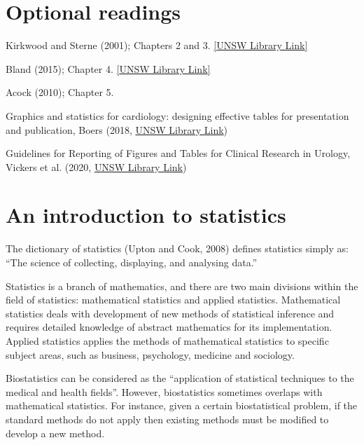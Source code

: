 \documentclass[
  a4paper,
]{memoir}
\begin{document}
\hypertarget{optional-readings}{%
\section*{Optional readings}\label{optional-readings}}


Kirkwood and Sterne (2001); Chapters 2 and 3.
\href{http://er1.library.unsw.edu.au/er/cgi-bin/eraccess.cgi?url=https://ebookcentral.proquest.com/lib/unsw/detail.action?docID=624728}{{[}UNSW
Library Link{]}}

Bland (2015); Chapter 4.
\href{http://er1.library.unsw.edu.au/er/cgi-bin/eraccess.cgi?url=https://ebookcentral.proquest.com/lib/unsw/detail.action?docID=5891730}{{[}UNSW
Library Link{]}}

Acock (2010); Chapter 5.

Graphics and statistics for cardiology: designing effective tables for
presentation and publication, Boers (2018,
\href{https://er1.library.unsw.edu.au/er/cgi-bin/eraccess.cgi?url=http://dx.doi.org/10.1136/heartjnl-2017-311581}{UNSW
Library Link})

Guidelines for Reporting of Figures and Tables for Clinical Research in
Urology, Vickers et al. (2020,
\href{https://er1.library.unsw.edu.au/er/cgi-bin/eraccess.cgi?url=http://dx.doi.org/10.1016/j.eururo.2020.04.048}{UNSW
Library Link})

\hypertarget{an-introduction-to-statistics}{%
\section{An introduction to
statistics}\label{an-introduction-to-statistics}}

The dictionary of statistics (Upton and Cook, 2008) defines statistics
simply as: ``The science of collecting, displaying, and analysing
data.''

Statistics is a branch of mathematics, and there are two main divisions
within the field of statistics: mathematical statistics and applied
statistics. Mathematical statistics deals with development of new
methods of statistical inference and requires detailed knowledge of
abstract mathematics for its implementation. Applied statistics applies
the methods of mathematical statistics to specific subject areas, such
as business, psychology, medicine and sociology.

Biostatistics can be considered as the ``application of statistical
techniques to the medical and health fields''. However, biostatistics
sometimes overlaps with mathematical statistics. For instance, given a
certain biostatistical problem, if the standard methods do not apply
then existing methods must be modified to develop a new method.
\end{document}

